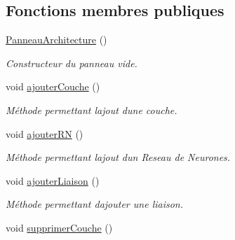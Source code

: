 \subsection*{Fonctions membres publiques}
\begin{DoxyCompactItemize}
\item 
\mbox{\label{classPanneauArchitecture_a1143575686655c5088510a94eac5c787}} 
\hyperlink{classPanneauArchitecture_a1143575686655c5088510a94eac5c787}{Panneau\+Architecture} ()
\begin{DoxyCompactList}\small\item\em Constructeur du panneau vide. \end{DoxyCompactList}\item 
\mbox{\label{classPanneauArchitecture_affc6f75cb58e1c50aad26510bc2c25ea}} 
void \hyperlink{classPanneauArchitecture_affc6f75cb58e1c50aad26510bc2c25ea}{ajouter\+Couche} ()
\begin{DoxyCompactList}\small\item\em Méthode permettant l\textquotesingle{}ajout d\textquotesingle{}une couche. \end{DoxyCompactList}\item 
\mbox{\label{classPanneauArchitecture_a49eb9dea42db4fb1b16d91cfc1c789c3}} 
void \hyperlink{classPanneauArchitecture_a49eb9dea42db4fb1b16d91cfc1c789c3}{ajouter\+RN} ()
\begin{DoxyCompactList}\small\item\em Méthode permettant l\textquotesingle{}ajout d\textquotesingle{}un Reseau de Neurones. \end{DoxyCompactList}\item 
\mbox{\label{classPanneauArchitecture_ac623d04cebc723d2e590712a337cd5ab}} 
void \hyperlink{classPanneauArchitecture_ac623d04cebc723d2e590712a337cd5ab}{ajouter\+Liaison} ()
\begin{DoxyCompactList}\small\item\em Méthode permettant d\textquotesingle{}ajouter une liaison. \end{DoxyCompactList}\item 
\mbox{\label{classPanneauArchitecture_a4b90aec081c2b2d0b2a3c3207183bd3f}} 
void \hyperlink{classPanneauArchitecture_a4b90aec081c2b2d0b2a3c3207183bd3f}{supprimer\+Couche} ()

\end{DoxyCompactItemize}
